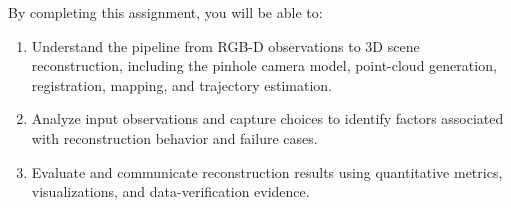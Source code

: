 \documentclass[11pt]{article}
\begin{document}



\vspace{1em}
By completing this assignment, you will be able to:
\begin{enumerate}
\item Understand the pipeline from RGB-D observations to 3D scene reconstruction, including the pinhole camera model, point-cloud generation, registration, mapping, and trajectory estimation.
\item Analyze input observations and capture choices to identify factors associated with reconstruction behavior and failure cases.
\item Evaluate and communicate reconstruction results using quantitative metrics, visualizations, and data-verification evidence.
\end{enumerate}
\end{document}
